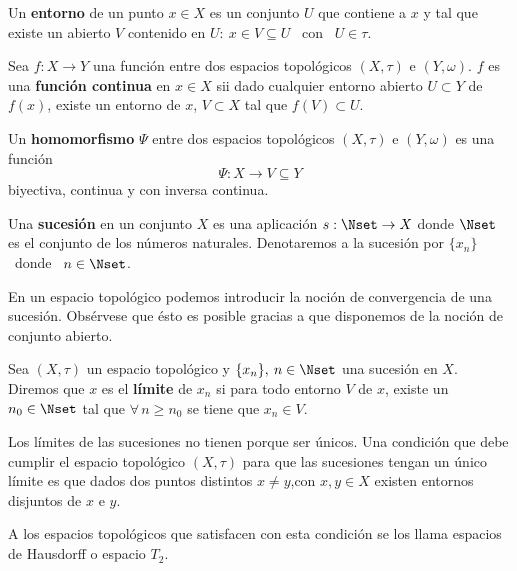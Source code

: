 \begin{definicion}
  Un {\bf entorno} de un punto $x \in X$ es un conjunto $U$ que contiene a $x$ y
  tal que existe un abierto $V$ contenido en  $U: \ x \in V \subseteq U$ \ con \
  $U \in \tau$.
\end{definicion}

\begin{definicion}
  Sea $f: X  \rightarrow Y$ una funci\'on entre  dos espacios topol\'ogicos $(X,
  \tau)$ e  $(Y,\omega)$. $f$ es una {\bf  funci\'on continua} en $x  \in X$ sii
  dado cualquier entorno  abierto $U \subset Y$ de $f(x)$,  existe un entorno de
  $x$, $V \subset X$ tal que $f(V) \subset U$.
\end{definicion}

\begin{definicion}
  Un  {\bf homomorfismo} $\Psi$  entre dos  espacios topol\'ogicos  $(X,\tau)$ e
  $(Y,\omega)$ es una funci\'on
  \[
  \Psi: X \rightarrow V \subseteq Y
  \]
  biyectiva, continua y con inversa continua.
\end{definicion}

\begin{definicion}
  Una  {\bf  sucesi\'on}  en un  conjunto  $X$  es  una aplicaci\'on  $s:  \Nset
  \rightarrow   X$   donde   $\Nset$   es   el   conjunto   de   los   n\'umeros
  naturales. Denotaremos  a la  sucesi\'on por  $\{ x_n \}$  \ donde  \ $  n \in
  \Nset$.
\end{definicion}

En un espacio topol\'ogico podemos introducir la noci\'on de convergencia de una
sucesi\'on. Obs\'ervese  que \'esto  es posible gracias  a que disponemos  de la
noci\'on de conjunto abierto.

\begin{definicion}
  Sea $(X,  \tau)$ un espacio  topol\'ogico y  $\{ x_n \},  \: n \in  \Nset$ una
  sucesi\'on en $X$. Diremos que $x$ es el {\bf l\'imite} de $x_n $ si para todo
  entorno $V$ de $x$, existe un $n_0  \in \Nset$ tal que $\forall \, n \geq n_0$
  se tiene que $x_n \in V$.
\end{definicion}

Los l\'imites de  las sucesiones no tienen porque  ser \'unicos. Una condici\'on
que  debe cumplir  el espacio  topol\'ogico $(X,\tau)$  para que  las sucesiones
tengan un \'unico l\'imite es que dados  dos puntos distintos $x \neq y$,con $ x
, y \in X$ existen entornos disjuntos de $x$ e $y$.

A los  espacios topol\'ogicos que satisfacen  con esta condici\'on  se los llama
espacios de Hausdorff o espacio $T_2$.


